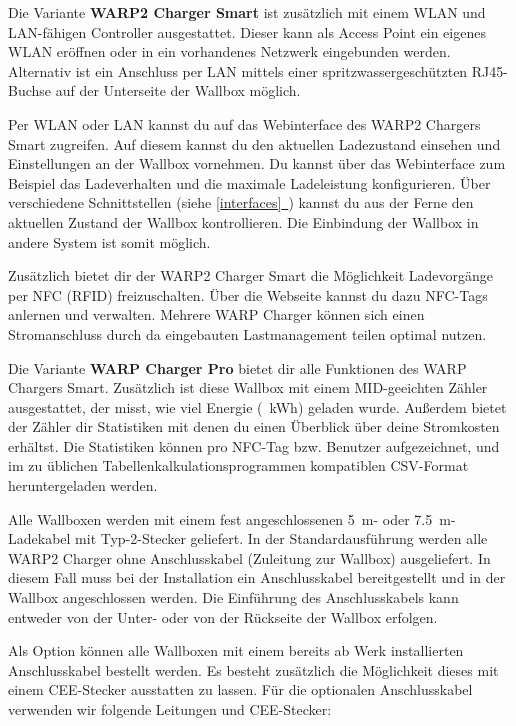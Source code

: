 \documentclass[a4paper,10pt]{article}
\newcommand*{\fullref}[1]{\hyperref[{#1}]{\ref*{#1}~\nameref*{#1}}}
\begin{document}
\begin{multicols*}{2}
	Die Variante \textbf{WARP2 Charger Smart} ist zusätzlich mit einem WLAN und
	LAN-fähigen Controller ausgestattet.
	Dieser kann als \nohyphens{Access} Point ein eigenes WLAN eröffnen oder in
	ein vorhandenes Netzwerk eingebunden werden. Alternativ ist ein Anschluss
	per LAN mittels einer spritzwassergeschützten RJ45-Buchse auf der
	Unterseite der Wallbox möglich.

	Per WLAN oder LAN kannst du auf das Webinterface des WARP2 Chargers Smart
	zugreifen. Auf diesem kannst du den aktuellen Ladezustand einsehen und
	Einstellungen an der Wallbox vornehmen. Du kannst über das Webinterface
	zum Beispiel das Ladeverhalten und die maximale Ladeleistung konfigurieren.
	Über verschiedene Schnittstellen (siehe \fullref{interfaces}) kannst du aus der Ferne den aktuellen Zustand
	der Wallbox kontrollieren. Die Einbindung der Wallbox in andere System ist somit möglich.

	Zusätzlich bietet dir der WARP2 Charger Smart die Möglichkeit Ladevorgänge
	per NFC (RFID) freizuschalten. Über die Webseite kannst du dazu NFC-Tags
	anlernen und verwalten. Mehrere WARP Charger können sich einen
	Stromanschluss durch da eingebauten Lastmanagement teilen optimal nutzen.

	Die Variante \textbf{WARP Charger Pro} bietet dir alle Funktionen des WARP Chargers Smart.
	Zusätzlich ist diese Wallbox mit einem MID-geeichten Zähler
	ausgestattet, der misst, wie viel Energie (\SI{}{\kWh}) geladen
	wurde. Außerdem bietet der Zähler dir Statistiken mit denen du einen Überblick über deine
	Stromkosten erhältst. Die Statistiken können pro NFC-Tag bzw. Benutzer aufgezeichnet,
	und im zu üblichen Tabellenkalkulationsprogrammen kompatiblen CSV-Format
	heruntergeladen werden.

	Alle Wallboxen werden mit einem fest angeschlossenen
	\SI{5}{\meter}- oder \SI{7,5}{\meter}-Ladekabel mit Typ-2-Stecker geliefert.
	In der Standardausführung werden alle WARP2 Charger ohne Anschlusskabel
	(Zuleitung zur Wallbox) ausgeliefert. In diesem Fall muss bei der Installation
	ein Anschlusskabel bereitgestellt und in der Wallbox angeschlossen werden.
	Die Einführung des Anschlusskabels kann entweder von der Unter- oder von
	der Rückseite der Wallbox erfolgen.

	Als Option können alle Wallboxen mit einem bereits ab Werk
	installierten Anschlusskabel bestellt werden. Es besteht zusätzlich die
	Möglichkeit dieses mit einem CEE-Stecker ausstatten zu lassen.
	Für die optionalen Anschluss\-kabel verwenden wir folgende Leitungen und CEE-Stecker:


\end{multicols*}
\end{document}
